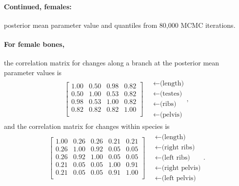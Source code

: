 \documentclass{article}
\begin{document}
\paragraph{Continued, females:} posterior mean parameter value and quantiles from 80,000 MCMC iterations.

\paragraph{For female bones,} the correlation matrix for changes along a branch at the posterior mean parameter values is \\
\begin{align}
\begin{bmatrix}
   1.00 & 0.50 & 0.98 & 0.82 \\ 
   0.50 & 1.00 & 0.53 & 0.82 \\ 
   0.98 & 0.53 & 1.00 & 0.82 \\ 
   0.82 & 0.82 & 0.82 & 1.00 \\ 
 \end{bmatrix}
\quad \begin{matrix}
  \leftarrow \text{(length)} \\
  \leftarrow \text{(testes)} \\
  \leftarrow \text{(ribs)} \\
  \leftarrow \text{(pelvis)} 
\end{matrix} ,
\end{align}
and the correlation matrix for changes within species is
\begin{align}
\begin{bmatrix}
   1.00 & 0.26 & 0.26 & 0.21 & 0.21 \\ 
   0.26 & 1.00 & 0.92 & 0.05 & 0.05 \\ 
   0.26 & 0.92 & 1.00 & 0.05 & 0.05 \\ 
   0.21 & 0.05 & 0.05 & 1.00 & 0.91 \\ 
   0.21 & 0.05 & 0.05 & 0.91 & 1.00 \\ 
 \end{bmatrix}
\quad \begin{matrix}
  \leftarrow \text{(length)} \\
  \leftarrow \text{(right ribs)} \\
  \leftarrow \text{(left ribs)} \\
  \leftarrow \text{(right pelvis)} \\
  \leftarrow \text{(left pelvis)} 
\end{matrix}  .
\end{align}
\end{document}
